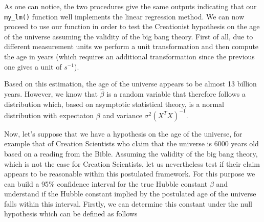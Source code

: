 \documentclass[12pt,]{krantz}
\newenvironment{Shaded}{\begin{snugshade}}{\end{snugshade}}
\newcommand{\DecValTok}[1]{\textcolor[rgb]{0.06,0.06,0.06}{#1}}
\newcommand{\FloatTok}[1]{\textcolor[rgb]{0.06,0.06,0.06}{#1}}
\newcommand{\StringTok}[1]{\textcolor[rgb]{0.5,0.5,0.5}{#1}}
\newcommand{\CommentTok}[1]{\textcolor[rgb]{0.37,0.37,0.37}{\textit{#1}}}
\newcommand{\OperatorTok}[1]{\textcolor[rgb]{0.43,0.43,0.43}{\textbf{#1}}}
\newcommand{\NormalTok}[1]{#1}
\begin{document}
As one can notice, the two procedures give the same outputs indicating
that our \texttt{my\_lm()} function well implements the linear
regression method. We can now proceed to use our function in order to
test the Creationist hypothesis on the age of the universe assuming the
validity of the big bang theory. First of all, due to different
measurement units we perform a unit transformation and then compute the
age in years (which requires an additional transformation since the
previous one gives a unit of \(s^{-1}\)).

\begin{Shaded}
\end{Shaded}

Based on this estimation, the age of the universe appears to be almost
13 billion years. However, we know that \(\hat{\beta}\) is a random
variable that therefore follows a distribution which, based on
asymptotic statistical theory, is a normal distribution with expectaton
\(\beta\) and variance \(\sigma^2(X^TX)^{-1}\).

Now, let's suppose that we have a hypothesis on the age of the universe,
for example that of Creation Scientists who claim that the universe is
6000 years old based on a reading from the Bible. Assuming the validity
of the big bang theory, which is not the case for Creation Scientists,
let us nevertheless test if their claim appears to be reasonable within
this postulated framework. For this purpose we can build a 95\%
confidence interval for the true Hubble constant \(\beta\) and
understand if the Hubble constant implied by the postulated age of the
universe falls within this interval. Firstly, we can determine this
constant under the null hypothesis which can be defined as follows
\end{document}
